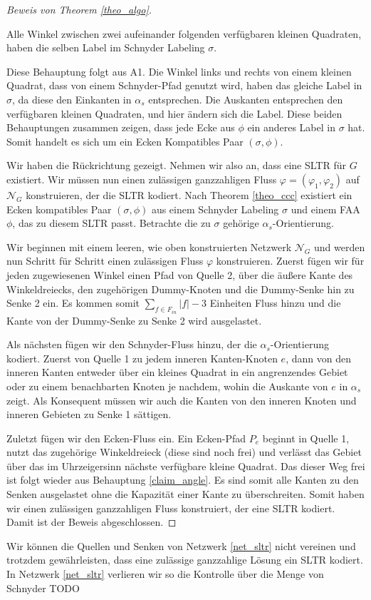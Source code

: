 \begin{proof}[Beweis von Theorem \ref{theo_algo}]
\begin{claim}\label{claim_angle}
Alle Winkel zwischen zwei aufeinander folgenden verfügbaren kleinen Quadraten, haben die selben Label im Schnyder Labeling $\sigma$.
\end{claim}
Diese Behauptung folgt aus A1. Die Winkel links und rechts von einem kleinen Quadrat, dass von einem Schnyder-Pfad genutzt wird, haben das gleiche Label in $\sigma$, da diese den Einkanten in $\alpha_s$ entsprechen. Die Auskanten entsprechen den verfügbaren kleinen Quadraten, und hier ändern sich die Label. Diese beiden Behauptungen zusammen zeigen, dass jede Ecke aus $\phi$ ein anderes Label in $\sigma$ hat. Somit handelt es sich um ein Ecken Kompatibles Paar $(\sigma,\phi)$.

Wir haben die Rückrichtung gezeigt. Nehmen wir also an, dass eine SLTR für $G$ existiert. Wir müssen nun einen zulässigen ganzzahligen Fluss $\varphi=(\varphi_1,\varphi_2)$ auf $\mathcal{N}_G$ konstruieren, der die SLTR kodiert. Nach Theorem \ref{theo_ccc} existiert ein Ecken kompatibles Paar $(\sigma,\phi)$ aus einem Schnyder Labeling $\sigma$ und einem FAA $\phi$, das zu diesem SLTR passt. Betrachte die zu $\sigma$ gehörige $\alpha_s$-Orientierung.

Wir beginnen mit einem leeren, wie oben konstruierten Netzwerk $\mathcal{N}_G$ und werden nun Schritt für Schritt einen zulässigen Fluss $\varphi$ konstruieren. Zuerst fügen wir für jeden zugewiesenen Winkel einen Pfad von Quelle 2, über die äußere Kante des Winkeldreiecks, den zugehörigen Dummy-Knoten und die Dummy-Senke hin zu Senke 2 ein. Es kommen somit $\sum_{f \in F_{in}}|f|-3$ Einheiten Fluss hinzu und die Kante von der Dummy-Senke zu Senke 2 wird ausgelastet. 

Als nächsten fügen wir den Schnyder-Fluss hinzu, der die $\alpha_s$-Orientierung kodiert. Zuerst von Quelle 1 zu jedem inneren Kanten-Knoten $e$, dann von den inneren Kanten entweder über ein kleines Quadrat in ein angrenzendes Gebiet oder zu einem benachbarten Knoten je nachdem, wohin die Auskante von $e$ in $\alpha_s$ zeigt. Als Konsequent müssen wir auch die Kanten von den inneren Knoten und inneren Gebieten zu Senke 1 sättigen.

Zuletzt fügen wir den Ecken-Fluss ein. Ein Ecken-Pfad $P_e$ beginnt in Quelle 1, nutzt das zugehörige Winkeldreieck (diese sind noch frei) und verlässt das Gebiet über das im Uhrzeigersinn nächste verfügbare kleine Quadrat. Das dieser Weg frei ist folgt wieder aus Behauptung \ref{claim_angle}. Es sind somit alle Kanten zu den Senken ausgelastet ohne die Kapazität einer Kante zu überschreiten. Somit haben wir einen zulässigen ganzzahligen Fluss konstruiert, der eine SLTR kodiert. Damit ist der Beweis abgeschlossen.
\end{proof}

\begin{remark}
Wir können die Quellen und Senken von Netzwerk \ref{net_sltr} nicht vereinen und trotzdem gewährleisten, dass eine zulässige ganzzahlige Lösung ein SLTR kodiert. In Netzwerk \ref{net_sltr} verlieren wir so die Kontrolle über die Menge von Schnyder TODO
\end{remark}


